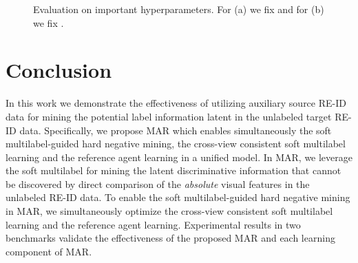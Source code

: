 \documentclass[10pt,twocolumn,letterpaper]{article}
\begin{document}
\begin{figure}[t]
\begin{center}
\vspace{-0.4cm}
\end{center}
   \caption{
   Evaluation on important hyperparameters.
   For (a) we fix  and for (b) we fix .
   }
\label{fig:lambda_vary}
\vspace{-0.4cm}
\end{figure}




\section{Conclusion}

In this work we demonstrate the effectiveness of utilizing auxiliary source RE-ID data
for mining the potential label information latent in the unlabeled target RE-ID data.
Specifically, we propose MAR which enables simultaneously
the soft multilabel-guided hard negative mining, the cross-view consistent soft multilabel learning and the reference agent learning
in a unified model.
In MAR, we leverage the soft multilabel
for mining the latent discriminative information
that cannot be discovered by direct comparison of the \emph{absolute} visual features in the unlabeled RE-ID data.
To enable the soft multilabel-guided hard negative mining in MAR,
we simultaneously optimize the cross-view consistent soft multilabel learning and the reference agent learning.
Experimental results in two benchmarks validate the effectiveness of the proposed MAR
and each learning component of MAR.

{\small


}
\end{document}

